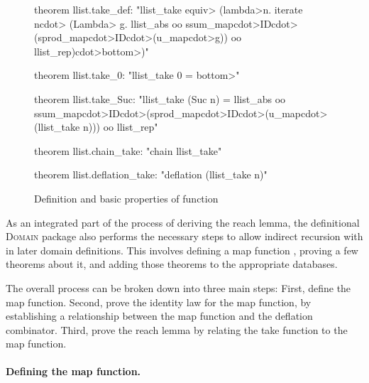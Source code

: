 \begin{figure}
\begin{isacode}
theorem llist.take_def:
  "llist_take \<equiv> (\<lambda>n. iterate n\<cdot>
    (\<Lambda> g. llist_abs oo ssum_map\<cdot>ID\<cdot>(sprod_map\<cdot>ID\<cdot>(u_map\<cdot>g)) oo llist_rep)\<cdot>\<bottom>)"
\end{isacode}
\unmedskip
\begin{isacode}
theorem llist.take_0: "llist_take 0 = \<bottom>"
\end{isacode}
\unmedskip
\begin{isacode}
theorem llist.take_Suc: "llist_take (Suc n) =
  llist_abs oo ssum_map\<cdot>ID\<cdot>(sprod_map\<cdot>ID\<cdot>(u_map\<cdot>(llist_take n))) oo llist_rep"
\end{isacode}
\unmedskip
\begin{isacode}
theorem llist.chain_take: "chain llist_take"
\end{isacode}
\unmedskip
\begin{isacode}
theorem llist.deflation_take: "deflation (llist_take n)"
\end{isacode}
\caption{Definition and basic properties of  function}
\label{fig:universal-llist-take}
\end{figure}

As an integrated part of the process of deriving the reach lemma, the definitional \textsc{Domain} package also performs the necessary steps to allow indirect recursion with  in later domain definitions. This involves defining a map function , proving a few theorems about it, and adding those theorems to the appropriate databases.

The overall process can be broken down into three main steps: First, define the map function. Second, prove the identity law for the map function, by establishing a relationship between the map function and the deflation combinator. Third, prove the reach lemma by relating the take function to the map function.

\paragraph{Defining the map function.}

